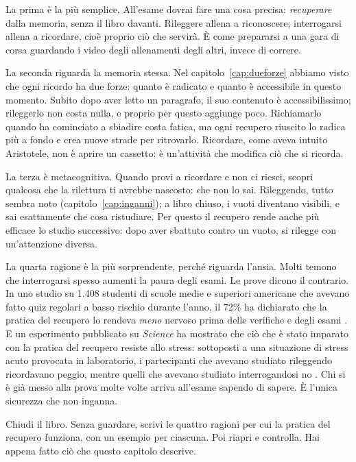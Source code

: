 La prima è la più semplice. All'esame dovrai fare una cosa precisa:
\emph{recuperare} dalla memoria, senza il libro davanti. Rileggere
allena a riconoscere; interrogarsi allena a ricordare, cioè proprio ciò
che servirà. È come prepararsi a una gara di corsa guardando i video
degli allenamenti degli altri, invece di correre.

La seconda riguarda la memoria stessa. Nel capitolo~\ref{cap:dueforze}
abbiamo visto che ogni ricordo ha due forze: quanto è radicato e quanto
è accessibile in questo momento. Subito dopo aver letto un paragrafo,
il suo contenuto è accessibilissimo; rileggerlo non costa nulla, e
proprio per questo aggiunge poco. Richiamarlo quando ha cominciato a
sbiadire costa fatica, ma ogni recupero riuscito lo radica più a fondo
e crea nuove strade per ritrovarlo. Ricordare, come aveva intuito
Aristotele, non è aprire un cassetto: è un'attività che modifica ciò che
si ricorda.

La terza è metacognitiva. Quando provi a ricordare e non ci riesci,
scopri qualcosa che la rilettura ti avrebbe nascosto: che non lo sai.
Rileggendo, tutto sembra noto (capitolo~\ref{cap:inganni}); a libro
chiuso, i vuoti diventano visibili, e sai esattamente che cosa
ristudiare. Per questo il recupero rende anche più efficace lo studio
successivo: dopo aver sbattuto contro un vuoto, si rilegge con
un'attenzione diversa.

La quarta ragione è la più sorprendente, perché riguarda l'ansia.
Molti temono che interrogarsi spesso aumenti la paura degli esami. Le
prove dicono il contrario. In uno studio su 1.408 studenti di scuole
medie e superiori americane che avevano fatto quiz regolari a basso
rischio durante l'anno, il 72\% ha dichiarato che la pratica del
recupero lo rendeva \emph{meno} nervoso prima delle verifiche e degli
esami \parencite{agarwal2014}. E un esperimento pubblicato su
\emph{Science} ha mostrato che ciò che è stato imparato con la pratica
del recupero resiste allo stress: sottoposti a una situazione di stress
acuto provocata in laboratorio, i partecipanti che avevano studiato
rileggendo ricordavano peggio, mentre quelli che avevano studiato
interrogandosi no \parencite{smith2016}. Chi si è già messo alla prova
molte volte arriva all'esame sapendo di sapere. È l'unica sicurezza che
non inganna.

\begin{esercizio}
Chiudi il libro. Senza guardare, scrivi le quattro ragioni per cui la
pratica del recupero funziona, con un esempio per ciascuna. Poi
riapri e controlla. Hai appena fatto ciò che questo capitolo descrive.
\end{esercizio}

